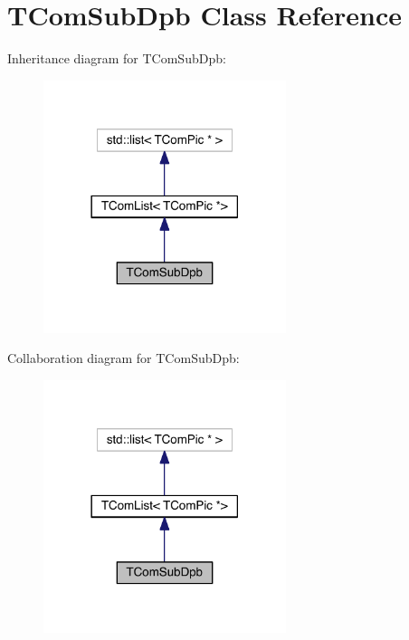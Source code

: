 \hypertarget{class_t_com_sub_dpb}{}\section{T\+Com\+Sub\+Dpb Class Reference}
\label{class_t_com_sub_dpb}


Inheritance diagram for T\+Com\+Sub\+Dpb\+:
\nopagebreak
\begin{figure}[H]
\begin{center}
\leavevmode
\includegraphics[width=201pt]{d2/df3/class_t_com_sub_dpb__inherit__graph}
\end{center}
\end{figure}


Collaboration diagram for T\+Com\+Sub\+Dpb\+:
\nopagebreak
\begin{figure}[H]
\begin{center}
\leavevmode
\includegraphics[width=201pt]{da/d7d/class_t_com_sub_dpb__coll__graph}
\end{center}
\end{figure}
